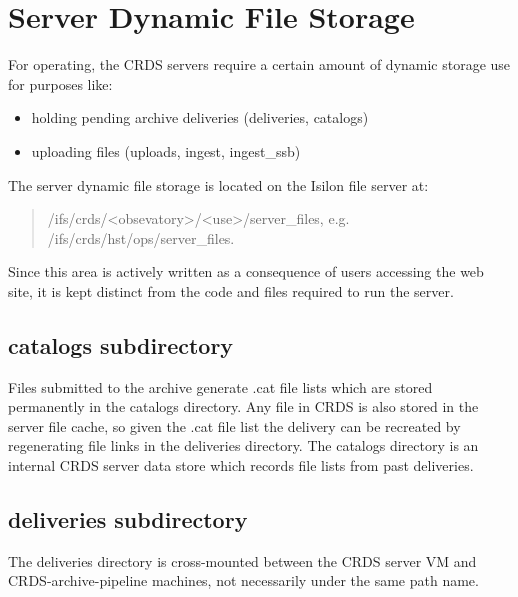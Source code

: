 \documentclass[letterpaper,10pt,english]{sphinxmanual}
\begin{document}
\section{Server Dynamic File Storage}
\label{server_guide:server-dynamic-file-storage}
For operating,  the CRDS servers require a certain amount of dynamic storage use for purposes like:
\begin{itemize}
\item {} 
holding pending archive deliveries  (deliveries, catalogs)

\item {} 
uploading files (uploads, ingest, ingest\_ssb)

\end{itemize}

The server dynamic file storage is located on the Isilon file server at:
\begin{quote}

/ifs/crds/\textless{}obsevatory\textgreater{}/\textless{}use\textgreater{}/server\_files,    e.g. /ifs/crds/hst/ops/server\_files.
\end{quote}

Since this area is actively written as a consequence of users accessing the web site,  it is kept distinct from the
code and files required to run the server.


\subsection{catalogs subdirectory}
\label{server_guide:catalogs-subdirectory}
Files submitted to the archive generate .cat file lists which are stored permanently in the catalogs directory.
Any file in CRDS is also stored in the server file cache,  so given the .cat file list the delivery can be recreated
by regenerating file links in the deliveries directory.  The catalogs directory is an internal CRDS server data store
which records file lists from past deliveries.


\subsection{deliveries subdirectory}
\label{server_guide:deliveries-subdirectory}
The deliveries directory is cross-mounted between the CRDS server VM and CRDS-archive-pipeline machines,  not
necessarily under the same path name.
\end{document}
